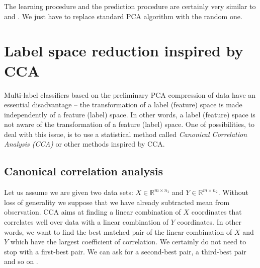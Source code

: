 The learning procedure and the prediction procedure are certainly very similar to  and . We just have to replace standard PCA algorithm with the random one.

\section{Label space reduction inspired by CCA}

Multi-label classifiers based on the preliminary PCA compression of data have an essential disadvantage -- the transformation of a label (feature) space is made independently of a feature (label) space. In other words, a label (feature) space is not aware of the transformation of a feature (label) space. One of possibilities, to deal with this issue, is to use a statistical method called \textit{Canonical Correlation Analysis (\textit{CCA})} or other methods inspired by CCA.   

\subsection{Canonical correlation analysis}

Let us assume we are given two data sets: $X \in \mathbb{R}^{m \times n_1}$ and $Y \in \mathbb{R}^{m \times n_2}$. Without loss of generality we suppose that we have already subtracted mean from observation. CCA aims at finding a linear combination of $X$ coordinates that correlates well over data with a linear combination of $Y$ coordinates. In other words, we want to find the best matched pair of the linear combination of $X$ and $Y$ which have the largest coefficient of correlation. We certainly do not need to stop with a first-best pair. We can ask for a second-best pair, a third-best pair and so on \citep{William}.

